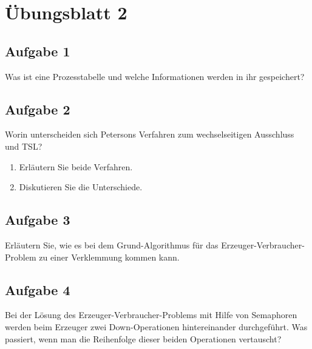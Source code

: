 \chapter{Übungsblatt 2}

\section{Aufgabe 1}

Was ist eine Prozesstabelle und welche Informationen werden in ihr gespeichert?

\section{Aufgabe 2}

Worin unterscheiden sich Petersons Verfahren zum wechselseitigen Ausschluss und TSL?

\begin{enumerate}
    \item Erläutern Sie beide Verfahren.
    \item Diskutieren Sie die Unterschiede.
\end{enumerate}

\section{Aufgabe 3}

Erläutern Sie, wie es bei dem Grund-Algorithmus für das Erzeuger-Verbraucher-Problem zu einer Verklemmung kommen kann.

\section{Aufgabe 4}

Bei der Lösung des Erzeuger-Verbraucher-Problems mit Hilfe von Semaphoren werden beim Erzeuger zwei Down-Operationen hintereinander durchgeführt. Was passiert, wenn man die Reihenfolge dieser beiden Operationen vertauscht?